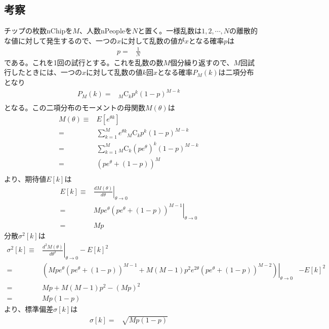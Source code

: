 \documentclass[ %
  platex,%
  papersize,%
  twocolumn,
  landscape
]{jsarticle}
\begin{document}
\subsection{考察}
チップの枚数nChipを$M$、人数nPeopleを$N$と置く。一様乱数は$1,2,\cdots,N$の離散的な値に対して発生するので、一つの$x$に対して乱数の値が$x$となる確率$p$は
\begin{align}
  p=&\frac{1}{N}&
\end{align}
である。これを1回の試行とする。これを乱数の数$M$個分繰り返すので、$M$回試行したときには、一つの$x$に対して乱数の値$k$回$x$となる確率$P_M(k)$は二項分布となり
\begin{align}
  P_M(k)=&{}_M \mathrm{C}_k p^k (1-p)^{M-k}&\\
\end{align}
となる。この二項分布のモーメントの母関数$M(\theta)$は
\begin{align}
  M(\theta)\equiv&E[e^{\theta k}]&\\
  =&\sum_{k=1}^{M}e^{\theta k}{}_M \mathrm{C}_k p^k (1-p)^{M-k}&\\
  =&\sum_{k=1}^{M}{}_M \mathrm{C}_k \left(pe^{\theta}\right)^k (1-p)^{M-k}&\\
  =&\left(pe^{\theta}+(1-p)\right)^M&\\
\end{align}
より、期待値$E[k]$は
\begin{align}
  E[k]\equiv&\left.\frac{dM(\theta)}{d\theta}\right|_{\theta\rightarrow0}&\\
  =&\left.Mpe^{\theta}\left(pe^{\theta}+(1-p)\right)^{M-1}\right|_{\theta\rightarrow0}&\\
  =&Mp&
\end{align}
分散$\sigma^{2}[k]$は
\begin{align}
  \sigma^{2}[k]\equiv&\left.\frac{d^{2}M(\theta)}{d\theta^2}\right|_{\theta\rightarrow0}-E[k]^2&\\
  =&\left.\left(Mpe^{\theta}\left(pe^{\theta}+(1-p)\right)^{M-1}+M(M-1)p^{2}e^{2\theta}\left(pe^{\theta}+(1-p)\right)^{M-2}\right)\right|_{\theta\rightarrow0}&-E[k]^2\\
  =&Mp+M(M-1)p^{2}-(Mp)^2&\\
  =&Mp(1-p)&
\end{align}
より、標準偏差$\sigma[k]$は
\begin{align}
  \sigma[k]=&\sqrt{Mp(1-p)}&
\end{align}
\end{document}
